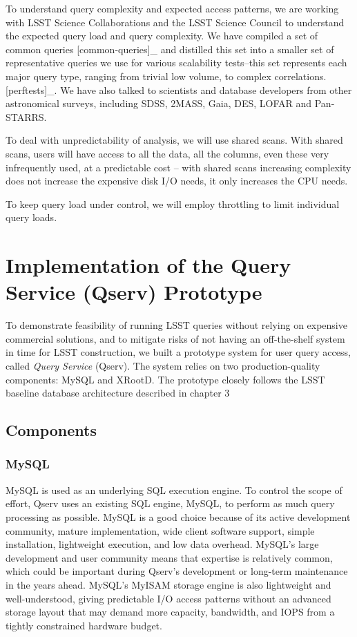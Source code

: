 \documentclass[DM,lsstdraft,toc]{lsstdoc}
\begin{document}
To understand query complexity and expected access patterns, we are
working with LSST Science Collaborations and the LSST Science Council to
understand the expected query load and query complexity. We have
compiled a set of common queries {[}common-queries{]}\_ and distilled
this set into a smaller set of representative queries we use for various
scalability tests--this set represents each major query type, ranging
from trivial low volume, to complex correlations. {[}perftests{]}\_. We
have also talked to scientists and database developers from other
astronomical surveys, including SDSS, 2MASS, Gaia, DES, LOFAR and
Pan-STARRS.

To deal with unpredictability of analysis, we will use shared scans.
With shared scans, users will have access to all the data, all the
columns, even these very infrequently used, at a predictable cost --
with shared scans increasing complexity does not increase the expensive
disk I/O needs, it only increases the CPU needs.

To keep query load under control, we will employ throttling to limit
individual query loads.

\section{Implementation of the Query Service (Qserv)
Prototype}\label{implementation}

To demonstrate feasibility of running LSST queries without relying on
expensive commercial solutions, and to mitigate risks of not having an
off-the-shelf system in time for LSST construction, we built a prototype
system for user query access, called \emph{Query Service} (Qserv). The
system relies on two production-quality components: MySQL and
XRootD. The prototype closely follows the LSST
baseline database architecture described in chapter 3

\subsection{Components}\label{components}

\subsubsection{MySQL}\label{mysql}

MySQL is used as an underlying SQL execution engine. To control the
scope of effort, Qserv uses an existing SQL engine, MySQL, to perform as
much query processing as possible. MySQL is a good choice because of its
active development community, mature implementation, wide client
software support, simple installation, lightweight execution, and low
data overhead. MySQL's large development and user community means that
expertise is relatively common, which could be important during Qserv's
development or long-term maintenance in the years ahead. MySQL's MyISAM
storage engine is also lightweight and well-understood, giving
predictable I/O access patterns without an advanced storage layout that
may demand more capacity, bandwidth, and IOPS from a tightly constrained
hardware budget.
\end{document}
